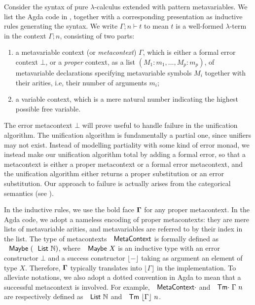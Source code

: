Consider the syntax of pure $\lambda$-calculus extended with pattern
metavariables. We list the Agda code in , together
with a corresponding presentation as inductive rules generating the
syntax. We write $\Gamma;n\vdash t$ to mean $t$ is a well-formed
$\lambda$-term in the context $\Gamma;n$, consisting of two parts:
\begin{enumerate}
\item a metavariable context (or \emph{metacontext}) $\Gamma$, which is
either a formal error context $\bot$, or a \emph{proper }context,
as a list $(M_{1}:m_{1},\dots,M_{p}:m_{p})$, of metavariable declarations
specifying metavariable symbols $M_{i}$ together with their arities,
i.e, their number of arguments $m_{i}$;
\item a variable context, which is a mere natural number indicating the
highest possible free variable.
\end{enumerate}
The error metacontext $\bot$ will prove useful to handle failure
in the unification algorithm. The unification algorithm is fundamentally
a partial one, since unifiers may not exist. Instead of modelling
partiality with some kind of error monad, we instead make our unification
algorithm total by adding a formal error, so that a metacontext is
either a proper metacontext or a formal error metacontext, and the
unification algorithm either returns a proper substitution or an error
substitution. Our approach to failure is actually arises from the
categorical semantics (see ). 

In the inductive rules, we use the bold face $\boldsymbol{\Gamma}$
for any proper metacontext. In the Agda code, we adopt a nameless
encoding of proper metacontexts: they are mere lists of metavariable
arities, and metavariables are referred to by their index in the list.
The type of metacontexts $\AgdaFunction{MetaContext}$ is formally
defined as $\AgdaDatatype{Maybe}\ (\AgdaDatatype{List}\ \mathbb{N})$,
where $\AgdaDatatype{Maybe}\ X$ is an inductive type with an error
constructor $\bot$ and a success constructor $\lfloor-\rfloor$ taking
as argument an element of type $X$. Therefore, $\boldsymbol{\Gamma}$
typically translates into $\lfloor\Gamma\rfloor$ in the implementation.
To alleviate notations, we also adopt a dotted convention in Agda
to mean that a successful metacontext is involved. For example, $\AgdaFunction{MetaContext\ensuremath{\cdot}}$
and $\AgdaFunction{Tm\ensuremath{\cdot}}\ \Gamma\ n$ are respectively
defined as $\AgdaDatatype{List}\ \mathbb{N}$ and $\AgdaDatatype{Tm}\ \lfloor\Gamma\rfloor\ n$. 

